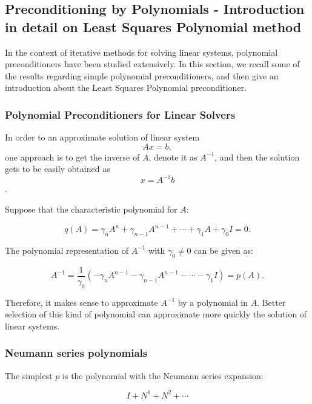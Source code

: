 {\subsection{Preconditioning by Polynomials - Introduction in detail on Least Squares Polynomial method}\label{Preconditioning by Polynomials - Introduction in detail on Least Squares Polynomial method}

In the context of iterative methods for solving linear systems, polynomial preconditioners have been studied extensively. In this section, we recall some of the results regarding simple polynomial preconditioners, and then give an introduction about the Least Squares Polynomial preconditioner.

\subsubsection{Polynomial Preconditioners for Linear Solvers}

In order to an approximate solution of linear system \[Ax=b,\]one approach is to get the inverse of $A$, denote it as $A^{-1}$, and then the solution gets to be easily obtained as \[x=A^{-1}b\].

Suppose that the characteristic polynomial for $A$:

\begin{equation}
q(A) = \gamma_nA^n+\gamma_{n-1}A^{n-1}+\cdots+\gamma_1A+\gamma_0I = 0.
\end{equation}

The polynomial representation of $A^{-1}$ with $\gamma_0 \neq 0$ can be given as:

\begin{equation}
A^{-1}=\frac{1}{\gamma_0}(-\gamma_nA^{n-1}-\gamma_{n-1}A^{n-1}-\cdots-\gamma_1I)=p(A).
\end{equation}

Therefore, it makes sense to approximate $A^{-1}$ by a polynomial in $A$.  Better selection of this kind of polynomial can approximate more quickly the solution of linear systems.

\subsubsection{Neumann series polynomials}

The simplest $p$ is the polynomial with the Neumann series expansion:

\begin{equation}
I+N^1+N^2+\cdots
\end{equation}

}
